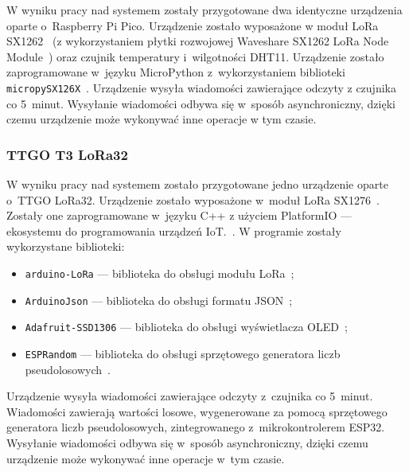 W wyniku pracy nad systemem zostały przygotowane dwa identyczne urządzenia oparte o~Raspberry Pi Pico.
Urządzenie zostało wyposażone w moduł LoRa SX1262~\cite{PICO:sx1262-doc} (z wykorzystaniem płytki rozwojowej Waveshare SX1262 LoRa Node Module~\cite{PICO:waveshare-doc}) oraz czujnik temperatury i~wilgotności DHT11.
Urządzenie zostało zaprogramowane w~języku MicroPython z~wykorzystaniem biblioteki \texttt{micropySX126X}~\cite{PICO:lora-lib}.
Urządzenie wysyła wiadomości zawierające odczyty z czujnika co 5~minut.
Wysyłanie wiadomości odbywa się w~sposób asynchroniczny, dzięki czemu urządzenie może wykonywać inne operacje w tym czasie.

\subsubsection{TTGO T3 LoRa32}
W wyniku pracy nad systemem zostało przygotowane jedno urządzenie oparte o~TTGO LoRa32.
Urządzenie zostało wyposażone w~moduł LoRa SX1276~\cite{ESP32:sx1276-doc}.
Zostały one zaprogramowane w~języku C++ z użyciem PlatformIO — ekosystemu do programowania urządzeń IoT.~\cite{tool:pio}.
W programie zostały wykorzystane biblioteki:
\begin{itemize}
    \item \texttt{arduino-LoRa} — biblioteka do obsługi modułu LoRa~\cite{ESP32:lora-lib};
    \item \texttt{ArduinoJson} — biblioteka do obsługi formatu JSON~\cite{ESP32:ArduinoJson};
    \item \texttt{Adafruit-SSD1306} — biblioteka do obsługi wyświetlacza OLED~\cite{ESP32:Adafruit-SSD1306};
    \item \texttt{ESPRandom} — biblioteka do obsługi sprzętowego generatora liczb pseudolosowych~\cite{ESP32:ESPRandom}.
\end{itemize}
Urządzenie wysyła wiadomości zawierające odczyty z~czujnika co 5~minut.
Wiadomości zawierają wartości losowe, wygenerowane za pomocą sprzętowego generatora liczb pseudolosowych, zintegrowanego z~mikrokontrolerem ESP32.
Wysyłanie wiadomości odbywa się w~sposób asynchroniczny, dzięki czemu urządzenie może wykonywać inne operacje w~tym czasie.

